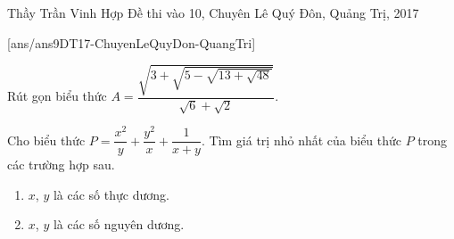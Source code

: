 \begin{name}
{Thầy  Trần Vinh Hợp}
{Đề thi vào 10, Chuyên Lê Quý Đôn, Quảng Trị, 2017}
\end{name}
\setcounter{ex}{0}
[ans/ans9DT17-ChuyenLeQuyDon-QuangTri]
\begin{ex}%
Rút gọn biểu thức $A=\dfrac{\sqrt{3+\sqrt{5-\sqrt{13+\sqrt{48}}}}}{\sqrt{6}+\sqrt{2}}$.
\end{ex}

\begin{ex}%
Cho biểu thức $P=\dfrac{x^2}{y}+\dfrac{y^2}{x}+\dfrac{1}{x+y}$. Tìm giá trị nhỏ nhất của biểu thức $P$ trong các trường hợp sau.
\begin{enumerate}
	\item $x$, $y$ là các số thực dương.
	\item $x$, $y$ là các số nguyên dương.
\end{enumerate}
\end{ex}

